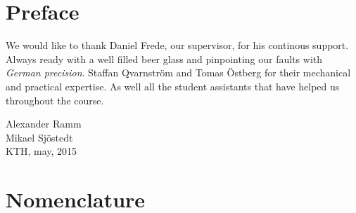 \documentclass[a4paper,11pt]{kth-mag}
\begin{document}
\chapter*{Preface}
We would like to thank Daniel Frede, our supervisor, for his continous support. Always ready with a well filled beer glass and pinpointing our faults with \textit{German precision}. Staffan Qvarnström and Tomas Östberg for their mechanical and practical expertise. As well all the student assistants that have helped us throughout the course.


\begin{flushright}Alexander Ramm \\Mikael Sjöstedt \\ KTH, may, 2015 \end{flushright}
 



\cleardoublepage
{}
\printindex
\tableofcontents*

\cleardoublepage
\chapter*{Nomenclature}
\end{document}
